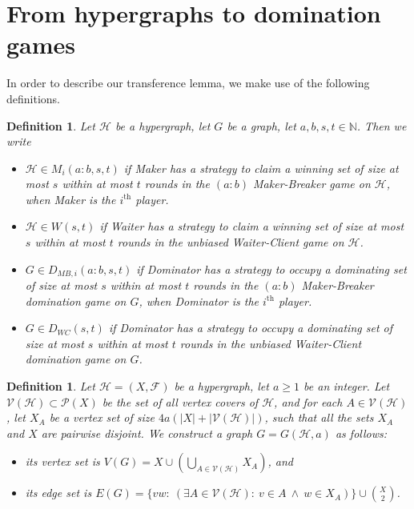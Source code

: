 \documentclass[reqno, 12pt]{amsart}
\numberwithin{equation}{section}
\numberwithin{figure}{section}
\newtheorem{definition}[theorem]{Definition}
\newcommand{\calH}{\mathcal{H}}
\newcommand{\calF}{\mathcal{F}}
\newcommand{\calV}{\mathcal{V}}
\begin{document}
\section{From hypergraphs to domination games}\label{sec:transference}

In order to describe our transference lemma,
we make use of the following definitions.

\begin{definition}\label{def:short.notation}
Let $\mathcal{H}$ be a hypergraph, 
let $G$ be a graph,
let $a,b,s,t\in\mathbb{N}$. Then we write
\begin{itemize}
\item $\mathcal{H} \in M_i(a:b,s,t)$ if
Maker has a strategy to claim a winning set
of size at most $s$ within at most $t$ rounds
in the $(a:b)$ Maker-Breaker game on $\mathcal{H}$,
when Maker is the $i^{\text{th}}$ player.
\item $\mathcal{H} \in W(s,t)$ if
Waiter has a strategy to claim a winning set
of size at most $s$ within at most $t$ rounds
in the unbiased Waiter-Client game on $\mathcal{H}$.
\item $G \in D_{MB,i}(a:b,s,t)$ if
Dominator has a strategy to occupy a dominating set
of size at most $s$ within at most $t$ rounds
in the $(a:b)$ Maker-Breaker domination game on $G$,
when Dominator is the $i^{\text{th}}$ player.
\item $G \in D_{WC}(s,t)$ if
Dominator has a strategy to occupy a dominating set
of size at most $s$ within at most $t$ rounds
in the unbiased Waiter-Client domination game on $G$.
\end{itemize}

\end{definition}




\begin{definition}\label{def:transference.construction}
Let $\calH = (X,\calF)$ be a hypergraph,
let $a\geq 1$ be an integer.
Let $\calV(\calH) \subset \mathcal{P}(X)$ be the set of all vertex covers of $\calH$, and for each $A\in \calV(\calH)$, 
let $X_A$ be a vertex set of size $4a(|X| + |\calV(\calH)|)$,
such that all the sets $X_A$ and $X$ are pairwise disjoint.
We construct a graph $G=G(\calH,a)$
as follows:
\begin{itemize}
\item its vertex set is 
$V(G)=X\cup (\bigcup_{A\in \calV(\calH)} X_A)$, and
\item its edge set is $E(G)=\{vw:~ (\exists A\in \calV(\calH):~v\in A ~ \land ~ w\in X_A)\} \cup \binom{X}{2}$.
\end{itemize}
\end{definition}
\end{document}
